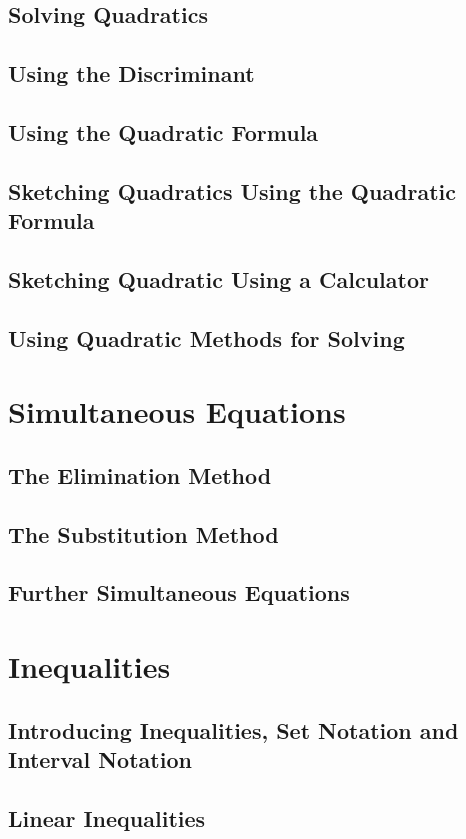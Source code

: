 \documentclass[../alevelmaths.tex]{subfiles}
\begin{document}
\subsection*{Solving Quadratics}
\subsection*{Using the Discriminant}
\subsection*{Using the Quadratic Formula}
\subsection*{Sketching Quadratics Using the Quadratic Formula}
\subsection*{Sketching Quadratic Using a Calculator}
\subsection*{Using Quadratic Methods for Solving}
\section{Simultaneous Equations}
\subsection*{The Elimination Method}
\subsection*{The Substitution Method}
\subsection*{Further Simultaneous Equations}
\section{Inequalities}
\subsection*{Introducing Inequalities, Set Notation and Interval Notation}
\subsection*{Linear Inequalities}
\end{document}
